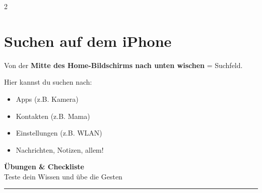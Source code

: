 \documentclass[a4paper,landscape,8pt]{extarticle}
\begin{document}
\begin{multicols}{2}
\vspace{4mm}

\begin{center}
\end{center}

\vspace{4mm}

\section*{Suchen auf dem iPhone}

Von der \textbf{Mitte des Home-Bildschirms nach unten wischen} = Suchfeld.

Hier kannst du suchen nach:
\begin{itemize}
\item Apps (z.B. \glqq Kamera\grqq{})
\item Kontakten (z.B. \glqq Mama\grqq{})
\item Einstellungen (z.B. \glqq WLAN\grqq{})
\item Nachrichten, Notizen, allem!
\end{itemize}

\end{multicols}

\newpage


\begin{center}
{\LARGE\bfseries Übungen \& Checkliste}\\[3pt]
{\normalsize Teste dein Wissen und übe die Gesten}
\end{center}

\vspace{2mm}
\hrule
\vspace{3mm}
\end{document}
